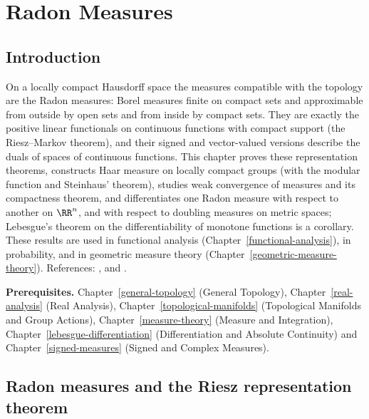 \chapter{Radon Measures}\label{radon-measures}

\section{Introduction}\label{radon-measures:section-introduction}

On a locally compact Hausdorff space the measures compatible with the topology are the Radon measures: Borel measures finite on compact sets and approximable from outside by open sets and from inside
by compact sets. They are exactly the positive linear functionals on continuous functions with compact support (the Riesz--Markov theorem), and their signed and vector-valued versions describe the duals
of spaces of continuous functions. This chapter proves these representation theorems, constructs Haar measure on locally compact groups (with the modular function and
Steinhaus' theorem), studies weak convergence of measures and its compactness theorem, and differentiates one Radon measure with
respect to another on $\RR^n$, and with respect to doubling measures on metric spaces; Lebesgue's theorem on the differentiability of monotone functions is a corollary. These results are used in
functional analysis (Chapter~\ref{functional-analysis}), in probability, and in geometric measure theory (Chapter~\ref{geometric-measure-theory}).
References: \cite{rudin-rca}, \cite{folland-real} and \cite{mattila-1995}.

\noindent\textbf{Prerequisites.} Chapter~\ref{general-topology} (General Topology), Chapter~\ref{real-analysis} (Real Analysis), Chapter~\ref{topological-manifolds} (Topological Manifolds and Group Actions),
Chapter~\ref{measure-theory} (Measure and Integration), Chapter~\ref{lebesgue-differentiation} (Differentiation and Absolute Continuity) and Chapter~\ref{signed-measures} (Signed and Complex Measures).

\section{Radon measures and the Riesz representation theorem}\label{radon-measures:section-radon}

